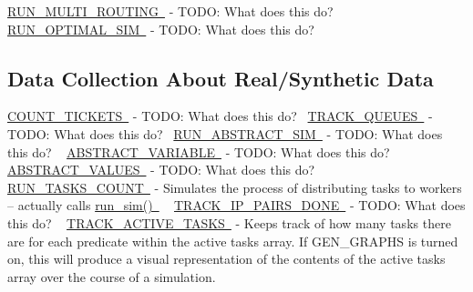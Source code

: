  \mbox{\hyperlink{namespacedynamicfilterapp_1_1toggles_a5f084acb116f3a65b90532f6a2ecb81b}{R\+U\+N\+\_\+\+M\+U\+L\+T\+I\+\_\+\+R\+O\+U\+T\+I\+NG }} -\/ T\+O\+DO\+: What does this do? ~\newline
 \mbox{\hyperlink{namespacedynamicfilterapp_1_1toggles_a82ca5524da03a0787588ac48df06bb1a}{R\+U\+N\+\_\+\+O\+P\+T\+I\+M\+A\+L\+\_\+\+S\+IM }} -\/ T\+O\+DO\+: What does this do? ~\newline
 \hypertarget{toggles_data2}{}\subsection{Data Collection About Real/\+Synthetic Data}\label{toggles_data2}
\mbox{\hyperlink{namespacedynamicfilterapp_1_1toggles_ac35fabae4c109189ac40e759f367ee79}{C\+O\+U\+N\+T\+\_\+\+T\+I\+C\+K\+E\+TS }} -\/ T\+O\+DO\+: What does this do?~\newline
 \mbox{\hyperlink{namespacedynamicfilterapp_1_1toggles_a170d7dba5203e9b2ab89eb541ed83b3a}{T\+R\+A\+C\+K\+\_\+\+Q\+U\+E\+U\+ES }} -\/ T\+O\+DO\+: What does this do?~\newline
\mbox{\hyperlink{namespacedynamicfilterapp_1_1toggles_a73b7b22a82dc40407d03e22dca8ac257}{R\+U\+N\+\_\+\+A\+B\+S\+T\+R\+A\+C\+T\+\_\+\+S\+IM }} -\/ T\+O\+DO\+: What does this do? ~\newline
 \mbox{\hyperlink{namespacedynamicfilterapp_1_1toggles_a05ba5c39ee5a05284597d091b01650a3}{A\+B\+S\+T\+R\+A\+C\+T\+\_\+\+V\+A\+R\+I\+A\+B\+LE }} -\/ T\+O\+DO\+: What does this do? ~\newline
 \mbox{\hyperlink{namespacedynamicfilterapp_1_1toggles_ab64c8432c11e4b89425ac1f220ca01a9}{A\+B\+S\+T\+R\+A\+C\+T\+\_\+\+V\+A\+L\+U\+ES }} -\/ T\+O\+DO\+: What does this do? ~\newline
 \mbox{\hyperlink{namespacedynamicfilterapp_1_1toggles_a904bebe166c12146cac5f4dec979450c}{R\+U\+N\+\_\+\+T\+A\+S\+K\+S\+\_\+\+C\+O\+U\+NT }} -\/ Simulates the process of distributing tasks to workers -- actually calls \mbox{\hyperlink{}{run\+\_\+sim() }} ~\newline
 \mbox{\hyperlink{namespacedynamicfilterapp_1_1toggles_ac1bb03e2d3e1f9304e6628d802795547}{T\+R\+A\+C\+K\+\_\+\+I\+P\+\_\+\+P\+A\+I\+R\+S\+\_\+\+D\+O\+NE }} -\/ T\+O\+DO\+: What does this do? ~\newline
 \mbox{\hyperlink{namespacedynamicfilterapp_1_1toggles_a9c5fce243b39b491bbdf705555a92617}{T\+R\+A\+C\+K\+\_\+\+A\+C\+T\+I\+V\+E\+\_\+\+T\+A\+S\+KS }} -\/ Keeps track of how many tasks there are for each predicate within the active tasks array. If G\+E\+N\+\_\+\+G\+R\+A\+P\+HS is turned on, this will produce a visual representation of the contents of the active tasks array over the course of a simulation. ~\newline
